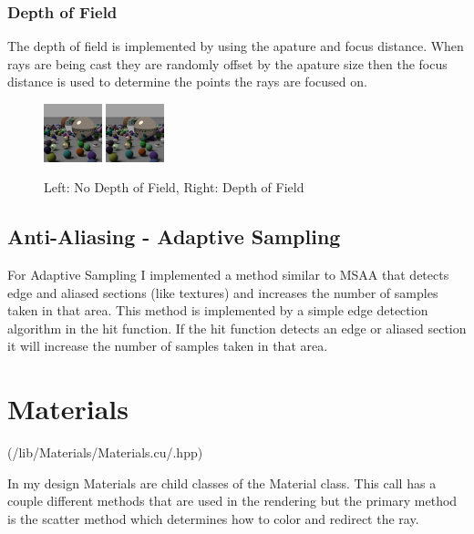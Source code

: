 \documentclass{article}
\begin{document}
        \subsubsection{Depth of Field}
        The depth of field is implemented by using the apature and focus distance. When rays are being cast they are randomly offset by the apature size then the focus distance is used to determine the points the rays are focused on. \par
        \begin{figure}[H]
            \centering
            \includegraphics[width=0.15\textwidth]{samples/DOF-none.png}
            \includegraphics[width=0.15\textwidth]{samples/DOF.png}
            \caption{Left: No Depth of Field, Right: Depth of Field}
        \end{figure}


    \subsection{Anti-Aliasing - Adaptive Sampling}
    For Adaptive Sampling I implemented a method similar to MSAA that detects edge and aliased sections (like textures) and increases the number of samples taken in that area. This method is implemented by a simple edge detection algorithm in the hit function. If the hit function detects an edge or aliased section it will increase the number of samples taken in that area. \par


\section{Materials}
    (/lib/Materials/Materials.cu/.hpp)\par
    In my design Materials are child classes of the Material class. This call has a couple different methods that are used in the rendering but the primary method is the scatter method which determines how to color and redirect the ray. \par
\end{document}
